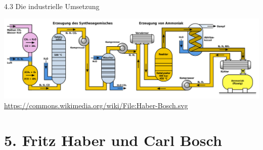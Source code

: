 \documentclass[
    aspectratio=1610
    ]{beamer}
\begin{document}
    \begin{frame}{4.3 Die industrielle Umsetzung}\hspace{-1cm}
        \begin{minipage}{10cm}
            \includegraphics[scale=.28]{figures/Haber-Bosch-Process.png}
        \tiny\url{https://commons.wikimedia.org/wiki/File:Haber-Bosch.svg}
        \end{minipage}
    \end{frame}        

    \section{\textbf{5.} Fritz Haber und Carl Bosch}
    
\end{document}
